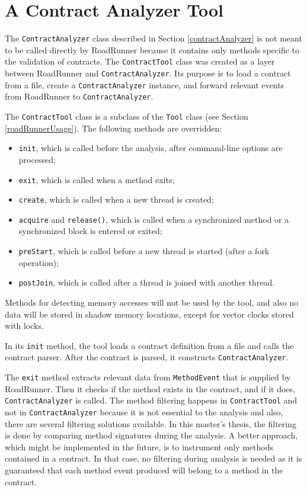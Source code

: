 \section{A Contract Analyzer Tool}
\label{contractTool}

The \texttt{ContractAnalyzer} class described in Section \ref{contractAnalyzer}
is not meant to be called directly by RoadRunner because it contains only
methods specific to the validation of contracts. The \texttt{ContractTool} class
was created as a layer between RoadRunner and \texttt{ContractAnalyzer}. Its
purpose is to load a contract from a file, create a \texttt{ContractAnalyzer}
instance, and forward relevant events from RoadRunner to
\texttt{ContractAnalyzer}.

The \texttt{ContractTool} class is a subclass of the \texttt{Tool} class (see
Section \ref{roadRunnerUsage}). The following methods are overridden:
\begin{itemize}
    \item \texttt{init}, which is called before the analysis, after
        command-line options are processed;
    \item \texttt{exit}, which is called when a method exits;
    \item \texttt{create}, which is called when a new thread is created;
    \item \texttt{acquire} and \texttt{release()}, which is called when a
        synchronized method or a synchronized block is entered or exited;
    \item \texttt{preStart}, which is called before a new thread is started
        (after a fork operation);
    \item \texttt{postJoin}, which is called after a thread is joined with
        another thread.
\end{itemize}

Methods for detecting memory accesses will not be used by the tool, and also no
data will be stored in shadow memory locations, except for vector clocks stored
with locks.

In its \texttt{init} method, the tool loads a contract definition from a file
and calls the contract parser. After the contract is parsed, it constructs
\texttt{ContractAnalyzer}.

The \texttt{exit} method extracts relevant data from \texttt{MethodEvent} that
is supplied by RoadRunner. Then it checks if the method exists in the contract,
and if it does, \texttt{ContractAnalyzer} is called. The method filtering
happens in \texttt{ContractTool} and not in \texttt{ContractAnalyzer} because it
is not essential to the analysis and also, there are several filtering solutions
available. In this master's thesis, the filtering is done by comparing method
signatures during the analysis. A better approach, which might be implemented in
the future, is to instrument only methods contained in a contract. In that case,
no filtering during analysis is needed as it is guaranteed that each method
event produced will belong to a method in the contract.

